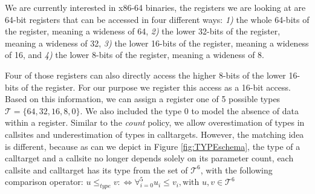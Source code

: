%
%
%

We are currently interested in x86-64 binaries, the registers we are looking at are 64-bit registers that can be accessed in four different ways:
\textit{1)} the whole 64-bits of the register, meaning a wideness of 64,
\textit{2)} the lower 32-bits of the register, meaning a wideness of 32,
\textit{3)} the lower 16-bits of the register, meaning a wideness of 16, and
\textit{4)} the lower 8-bits of the register, meaning a wideness of 8.

Four of those registers can also directly access the higher 8-bits of the lower 16-bits of the register. For our purpose we register this access as a 16-bit access. 
Based on this information,
we can assign a register one of 5 possible types $\mathcal{T} = \{64, 32, 16, 8, 0\}$. We also included the type 0 to model the absence of data within a register. 
Similar to the \emph{count} policy, we allow overestimation of types in callsites and underestimation of types in calltargets. However, the matching idea is different, 
because as can we depict in Figure \ref{fig:TYPEschema}, the type of a calltarget and a callsite no longer depends solely on its parameter count, 
each callsite and calltarget has its type from the set of $\mathcal{T}^6$, with the following comparison operator:
$
	u \leq_{type} v :\Longleftrightarrow  
	\forall_{i = 0}^{5} {u_i \leq v_i} , \text {with } u, v \in \mathcal{T}^6
$

